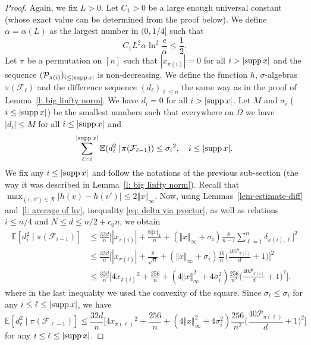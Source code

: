 \documentclass[12pt]{article}
\theoremstyle{definition}
\theoremstyle{plain}
\newcommand{\E}{\mathbb{E}}
\newcommand{\supp}{{\rm supp\,}}
\def\pvector{{\mathcal P}}
\def\relation{{\mathcal R}}
\begin{document}
\begin{proof}
Again, we fix $L>0$. Let $C_1>0$ be a large enough universal constant (whose exact value can be determined from the proof below). 
We define $\alpha=\alpha(L)$ as the largest number in $(0,1/4]$ such that
\begin{equation}\label{eq2: alpha condition}
C_1 L^2\alpha\ln^2\frac{e}{\alpha}\leq \frac{1}{2}.
\end{equation}
Let $\pi$ be a permutation on $[n]$ such that $|x_{\pi(i)}|=0$ for all $i>|\supp x|$ and
the sequence $(\pvector_{\pi(i)})_{i\leq |\supp x|}$ is non-decreasing.
We define the function $h$, $\sigma$-algebras $\pi(\mathcal F_\ell)$ and the difference sequence
$(d_\ell)_{\ell\leq n}$ the same way as in the proof of Lemma~\ref{l: big linfty norm}.
We have $d_i=0$ for all $i>|\supp x|$.
Let $M$ and $\sigma_i$ ($i\leq |\supp x|$) be the smallest numbers such that everywhere on $\Omega$ we have
$|d_i|\leq M$ for all $i\leq |\supp x|$ and
$$\sum_{\ell=i}^{|\supp x|}\E(d_\ell^2\,|\,\pi(\mathcal F_{\ell-1}))\leq {\sigma_i}^2,\quad i\leq |\supp x|.$$
We fix any $i\leq |\supp x|$ and follow the notations of the previous sub-section
(the way it was described in Lemma~\ref{l: big linfty norm}). 
Recall that $\max_{(v,v')\in \relation} \big\vert h(v)-h(v')\big\vert\leq 2\Vert x\Vert_\infty$. Now, using 
Lemmas~\ref{lem-estimate-diff} and~\ref{l: average of hv}, inequality \eqref{eq: delta via pvector}, as well as relations $i\leq n/4$
and $N\leq d\leq n/2+c_0 n$, we obtain
\begin{align*}
\E [d_i^2\mid \pi(\mathcal{F}_{i-1})]
&\leq \frac{32d}{n}
\Big[|x_{\pi(i)}|+\frac{8\Vert x\Vert_1}{n}
+(\Vert x\Vert_\infty+\sigma_i)\frac{8}{n-i} \sum_{\ell=1}^n \delta_{\pi(i),\ell}\Big]^2\\
&\leq \frac{32d}{n}
\Big[|x_{\pi(i)}|+\frac{8}{\sqrt{n}}
+(\Vert x\Vert_\infty+\sigma_i)\frac{16}{n}\Big(\frac{40\pvector_{\pi(i)}}{d}+1\Big)\Big]^2\\
&\leq \frac{32d}{n}\Big[4 {x_{\pi(i)}}^2+\frac{256}{n}+
(4\Vert x\Vert_\infty^2+4\sigma_i^2)\frac{256}{n^2}\Big(\frac{40\pvector_{\pi(i)}}{d}+1\Big)^2\Big],
\end{align*}
where in the last inequality we used the convexity of the square. Since $\sigma_\ell \leq \sigma_i$ for any 
$i\leq \ell \leq \vert \supp x\vert$, we have 
$$
\E [d_\ell^2\mid \pi(\mathcal{F}_{\ell-1})]\leq 
\frac{32d}{n}\Big[4 {x_{\pi(\ell)}}^2+\frac{256}{n}+
(4\Vert x\Vert_\infty^2+4\sigma_i^2)\frac{256}{n^2}\Big(\frac{40\pvector_{\pi(\ell)}}{d}+1\Big)^2\Big]
$$
for any $i\leq \ell\leq \vert \supp x\vert$.  

\end{proof}
\end{document}

